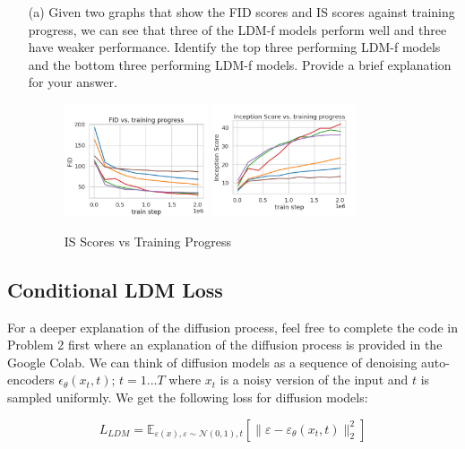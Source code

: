 \documentclass[a4paper]{article}
\begin{document}
\begin{itemize}
    \item [(a)]
    Given two graphs that show the FID scores and IS scores against training progress, we can see that three of the LDM-f models perform well and three have weaker performance. Identify the top three performing LDM-f models and the bottom three performing LDM-f models. Provide a brief explanation for your answer.

     \begin{figure}[htbp]
        \centering
        \includegraphics[width=0.4\textwidth]{fid_scores.png} \hfill
        \includegraphics[width=0.4\textwidth]{is_scores.png}
        \caption{IS Scores vs Training Progress}
        \label{fig:is}
    \end{figure}

\end{itemize}

\subsection{Conditional LDM Loss}
For a deeper explanation of the diffusion process, feel free to complete the code in Problem 2 first where an explanation of the diffusion process is provided in the Google Colab. We can think of diffusion models as a sequence of denoising auto-encoders \(\epsilon_{\theta}(x_t, t)\); \(t = 1...T\) where \(x_t\) is a noisy version of the input and  \(t\) is sampled uniformly.  We get the following loss for diffusion models:

\[L_{LDM} = \mathbb{E}_{\varepsilon(x), \varepsilon \sim \mathcal{N}(0, 1), t} [\| \varepsilon - \varepsilon_{\theta}(x_t, t) \|_2^2 ] \]
\end{document}
